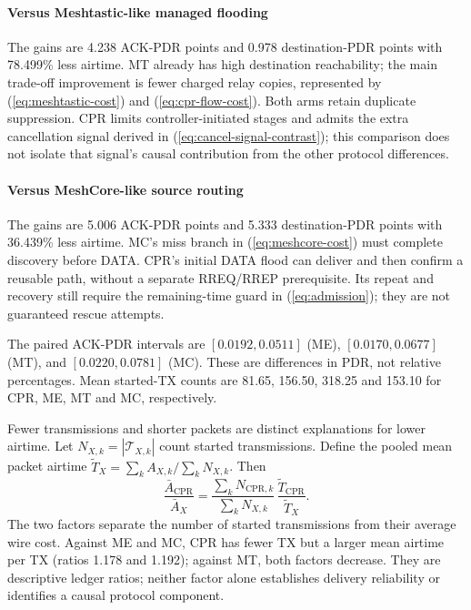 \documentclass[conference,letterpaper,10pt]{IEEEtran}
\begin{document}
\paragraph{Versus Meshtastic-like managed flooding}
The gains are 4.238 ACK-PDR points and 0.978 destination-PDR points with
78.499\% less airtime. MT already has high destination reachability;
the main trade-off improvement is fewer charged relay copies, represented
by (\ref{eq:meshtastic-cost}) and (\ref{eq:cpr-flow-cost}). Both arms
retain duplicate suppression. CPR limits controller-initiated stages and
admits the extra cancellation signal derived in
(\ref{eq:cancel-signal-contrast}); this comparison does not isolate that
signal's causal contribution from the other protocol differences.

\paragraph{Versus MeshCore-like source routing}
The gains are 5.006 ACK-PDR points and 5.333 destination-PDR points with
36.439\% less airtime. MC's miss branch in (\ref{eq:meshcore-cost}) must
complete discovery before DATA. CPR's initial DATA flood can deliver and
then confirm a reusable path, without a separate RREQ/RREP prerequisite.
Its repeat and recovery still require the remaining-time guard in
(\ref{eq:admission}); they are not guaranteed rescue attempts.

The paired ACK-PDR intervals are $[0.0192,0.0511]$ (ME),
$[0.0170,0.0677]$ (MT), and $[0.0220,0.0781]$ (MC).
These are differences in PDR, not relative percentages.
Mean started-TX counts are 81.65, 156.50, 318.25 and 153.10
for CPR, ME, MT and MC, respectively.

Fewer transmissions and shorter packets are distinct explanations for
lower airtime. Let $N_{X,k}=|\mathcal T_{X,k}|$ count started transmissions.
Define the pooled mean packet airtime
$\widetilde T_X=\sum_k A_{X,k}/\sum_k N_{X,k}$. Then
\begin{equation}
\frac{\bar A_{\mathrm{CPR}}}{\bar A_X}
 =\frac{\sum_kN_{\mathrm{CPR},k}}{\sum_kN_{X,k}}\,
   \frac{\widetilde T_{\mathrm{CPR}}}{\widetilde T_X}.
\label{eq:airtime-decomposition}
\end{equation}
The two factors separate the number of started transmissions from their
average wire cost. Against ME and MC, CPR has fewer TX but a larger mean
airtime per TX (ratios 1.178 and 1.192); against MT, both factors decrease.
They are descriptive ledger ratios; neither factor alone
establishes delivery reliability or identifies a causal protocol component.
\end{document}
